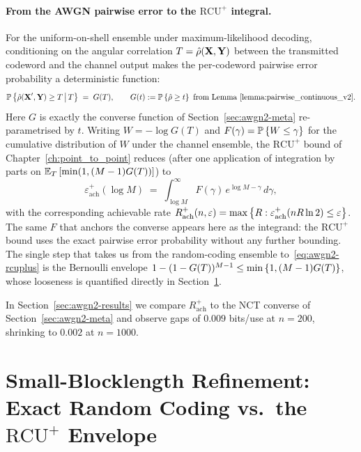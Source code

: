 \paragraph{From the AWGN pairwise error to the $\mathrm{RCU}^+$ integral.}
For the uniform-on-shell ensemble under maximum-likelihood decoding, conditioning on the angular correlation $T = \hat\rho(\textbf{X}, \textbf{Y})$ between the transmitted codeword and the channel output makes the per-codeword pairwise error probability a deterministic function:
\begin{equation*}
	\PR{\hat\rho(\bX', \bY) \ge T \,\big|\, T} \;=\; G(T), \qquad G(t) := \PR{\hat\rho \ge t}\text{ from Lemma~\ref{lemma:pairwise_continuous_v2}}.
\end{equation*}
Here $G$ is exactly the converse function of Section~\ref{sec:awgn2-meta} re-parametrised by $t$.  Writing $W = -\log G(T)$ and $F(\gamma) = \mathbb{P}\left\{ W \le \gamma \right\}$ for the cumulative distribution of $W$ under the channel ensemble, the $\mathrm{RCU}^+$ bound of Chapter~\ref{ch:point_to_point} reduces (after one application of integration by parts on $\mathbb{E}_{T} \left[ \min(1, (M-1) G(T)) \right]$) to
\begin{equation}\label{eq:awgn2-rcuplus}
	\varepsilon_{\mathrm{ach}}^+(\log M) \;=\; \int_{\log M}^{\infty} F(\gamma) \, e^{\log M - \gamma}\,d\gamma,
\end{equation}
with the corresponding achievable rate $R_{\mathrm{ach}}^+(n,\varepsilon) = \max\left\{ R:\varepsilon_{\mathrm{ach}}^+(nR \ln 2) \leq \varepsilon \right \}$.  The same $F$ that anchors the converse appears here as the integrand: the $\mathrm{RCU}^+$ bound uses the exact pairwise error probability without any further bounding.  The single step that takes us from the random-coding ensemble to~\eqref{eq:awgn2-rcuplus} is the Bernoulli envelope $1 - (1-G(T))^{M-1} \le \min\left\{ 1, (M-1) G(T) \right \}$, whose looseness is quantified directly in Section~\ref{sec:awgn2-exact-rc}.

In Section~\ref{sec:awgn2-results} we compare $R_{\mathrm{ach}}^+$ to the NCT converse of Section~\ref{sec:awgn2-meta} and observe gaps of $0.009$ bits/use at $n=200$, shrinking to $0.002$ at $n=1000$.

\section{Small-Blocklength Refinement: Exact Random Coding vs.\ the $\mathrm{RCU}^+$ Envelope}
\label{sec:awgn2-exact-rc}

